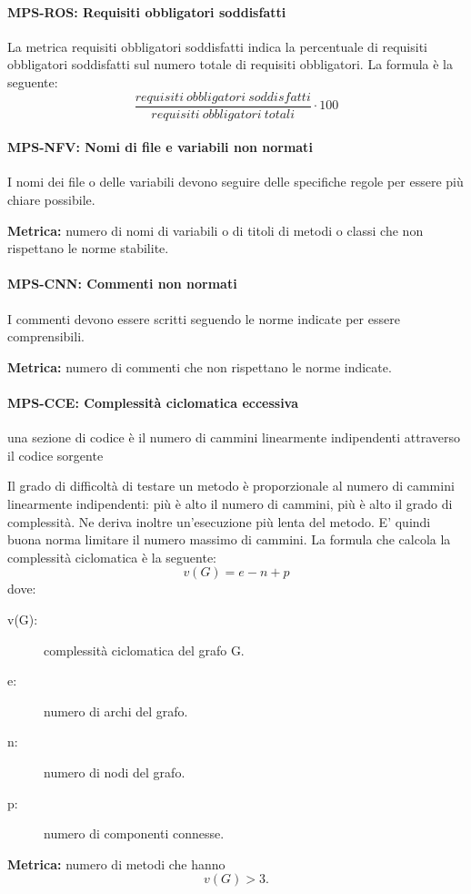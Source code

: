\documentclass[../../norme-di-progetto.tex]{subfiles}
\begin{document}
\paragraph{MPS-ROS: Requisiti obbligatori soddisfatti}%
\label{par:MPS-ROS_requisiti_obbligatori_soddisfatti}

La metrica requisiti obbligatori soddisfatti indica la percentuale di requisiti obbligatori soddisfatti sul numero totale di requisiti obbligatori. La formula è la seguente:
\[
  \frac{requisiti\ obbligatori\ soddisfatti}{requisiti\ obbligatori\ totali}\cdot 100
\]
\paragraph{MPS-NFV: Nomi di file e variabili non normati}%
\label{par:MPS-NFV_nomi_file_variabili_non_normati}

I nomi dei file o delle variabili devono seguire delle specifiche regole per essere più chiare possibile.

\textbf{Metrica:} numero di nomi di variabili o di titoli di metodi o classi che non rispettano le norme stabilite.

\paragraph{MPS-CNN: Commenti non normati}%
\label{par:MPS-CNN_commenti_non_normati}

I commenti devono essere scritti seguendo le norme indicate per essere comprensibili.

\textbf{Metrica:} numero di commenti che non rispettano le norme indicate.

\paragraph{MPS-CCE: Complessità ciclomatica eccessiva}%
\label{par:MPS-CCE_complessita_ciclomatica_eccessiva}
una sezione di codice è il numero di cammini linearmente indipendenti attraverso il codice sorgente

Il grado di difficoltà di testare un metodo è proporzionale al numero di cammini linearmente indipendenti: più è alto il numero di cammini, più è alto il grado di complessità.
Ne deriva inoltre un'esecuzione più lenta del metodo. E' quindi buona norma limitare il numero massimo di cammini.
La formula che calcola la complessità ciclomatica è la seguente:
\[
  v(G) = e - n + p
\]
dove:
\begin{description}
  \item[v(G):] complessità ciclomatica del grafo G. %
  \item[e:] numero di archi del grafo.
  \item[n:] numero di nodi del grafo.
  \item[p:] numero di componenti connesse.
\end{description}
\textbf{Metrica:} numero di metodi che hanno \[v(G) > 3.\]
\end{document}
